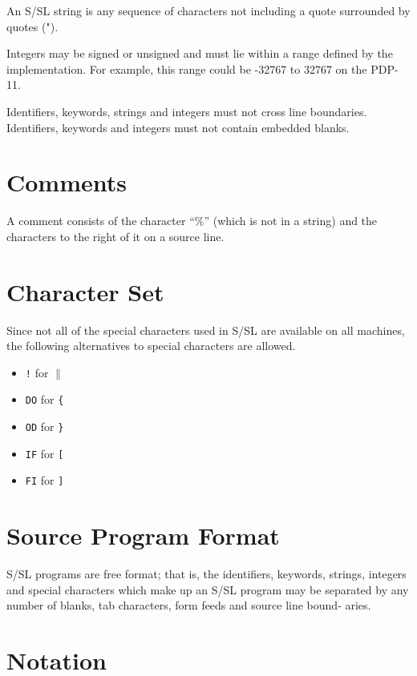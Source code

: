 An S/SL string is any sequence of characters not  
including a quote surrounded by quotes (").

Integers  may be signed or unsigned and must lie within a
range defined by  the  implementation.   For  example,  this
range could be -32767 to 32767 on the PDP-11.

Identifiers, keywords,  strings  and  integers  must not
cross line boundaries.  Identifiers, keywords  and  integers
must not contain embedded blanks.




\section{Comments}

A  comment consists of the character ``\%'' (which is not in
a string) and the characters to the right of it on a  source
line.




\section{Character Set}

Since  not all of the special characters used in S/SL are
available on all machines,  the  following  alternatives  to
special characters are allowed.
\begin{itemize}
\item {\tt !} for {\tt $\|$}
\item {\tt DO} for {\tt \{}
\item {\tt OD} for {\tt \}}
\item {\tt IF} for {\tt [}
\item {\tt FI} for {\tt ]}
\end{itemize}





\section{Source Program Format}

S/SL programs are free format; that is, the identifiers,
keywords, strings, integers  and  special  characters  which
make  up  an  S/SL program may be separated by any number of
blanks, tab characters, form feeds and  source  line  bound-
aries.




\section{Notation}

